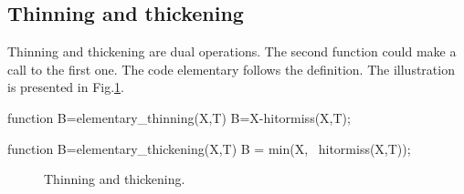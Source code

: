 \subsection{Thinning and thickening}
Thinning and thickening are dual operations. The second function could make a call to the first one. The code elementary follows 
the definition. The illustration is presented in Fig.\ref{fig:morphological_skeleton:matlab:thinning}.

\begin{matlab}
function B=elementary_thinning(X,T)
B=X-hitormiss(X,T);
\end{matlab}

\begin{matlab}
function B=elementary_thickening(X,T)
B = min(X, ~hitormiss(X,T));
\end{matlab}

\begin{figure}[htbp]
 \centering
 
 \hspace*{1cm}
 
 \caption{Thinning and thickening.}
 \label{fig:morphological_skeleton:matlab:thinning}
\end{figure}

